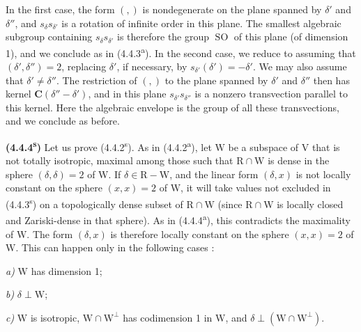 \documentclass[11pt,leqno]{article}
\begin{document}
In the first case, the form \((,)\) is nondegenerate on the plane spanned by \(\delta'\) and \(\delta''\), and \(s_\delta s_{\delta'}\) is a rotation of infinite order in this plane. The smallest algebraic subgroup containing \(s_\delta s_{\delta'}\) is therefore the group \(\operatorname{SO}\) of this plane (of dimension 1), and we conclude as in (4.4.3\textsuperscript{a}). In the second case, we reduce to assuming that \((\delta',\delta'')=2\), replacing \(\delta'\), if necessary, by \(s_{\delta'}(\delta')=-\delta'\). We may also assume that \(\delta'\neq\delta''\). The restriction of \((,)\) to the plane spanned by \(\delta'\) and \(\delta''\) then has kernel \(\mathbf{C}(\delta''-\delta')\), and in this plane \(s_{\delta'}s_{\delta''}\) is a nonzero transvection parallel to this kernel. Here the algebraic envelope is the group of all these transvections, and we conclude as before.

\textbf{(4.4.4\textsuperscript{s})} Let us prove (4.4.2\textsuperscript{s}). As in (4.4.2\textsuperscript{a}), let \(\mathrm{W}\) be a subspace of \(\mathrm{V}\) that is not totally isotropic, maximal among those such that \(\mathrm{R}\cap\mathrm{W}\) is dense in the sphere \((\delta,\delta)=2\) of \(\mathrm{W}\). If \(\delta\in\mathrm{R}-\mathrm{W}\), and the linear form \((\delta,x)\) is not locally constant on the sphere \((x,x)=2\) of \(\mathrm{W}\), it will take values not excluded in (4.4.3\textsuperscript{s}) on a topologically dense subset of \(\mathrm{R}\cap\mathrm{W}\) (since \(\mathrm{R}\cap\mathrm{W}\) is locally closed and Zariski-dense in that sphere). As in (4.4.4\textsuperscript{a}), this contradicts the maximality of \(\mathrm{W}\). The form \((\delta,x)\) is therefore locally constant on the sphere \((x,x)=2\) of \(\mathrm{W}\). This can happen only in the following cases :
\par\noindent\textit{a)} \(\mathrm{W}\) has dimension 1;
\par\noindent\textit{b)} \(\delta\perp\mathrm{W}\);
\par\noindent\textit{c)} \(\mathrm{W}\) is isotropic, \(\mathrm{W}\cap\mathrm{W}^{\perp}\) has codimension 1 in \(\mathrm{W}\), and \(\delta\perp(\mathrm{W}\cap\mathrm{W}^{\perp})\).
\end{document}
